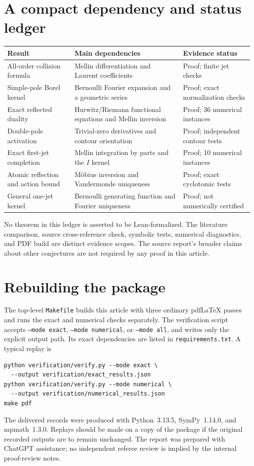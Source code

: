 \documentclass[11pt,a4paper]{article}
\numberwithin{equation}{section}
\theoremstyle{definition}\newtheorem{definition}[theorem]{Definition}
\theoremstyle{remark}\newtheorem{remark}[theorem]{Remark}
\begin{document}
\appendix
\section{A compact dependency and status ledger}
\label{app:ledger}

\begin{center}
\small
\begin{tabular}{@{}p{45mm}p{58mm}p{35mm}@{}}
\toprule
Result & Main dependencies & Evidence status\\
\midrule
All-order collision formula & Mellin differentiation and Laurent coefficients
 & Proof; finite jet checks\\[3pt]
Simple-pole Borel kernel & Bernoulli Fourier expansion and a geometric series
 & Proof; exact normalization checks\\[3pt]
Exact reflected duality & Hurwitz/Riemann functional equations and Mellin inversion
 & Proof; 36 numerical instances\\[3pt]
Double-pole activation & Trivial-zero derivatives and contour orientation
 & Proof; independent contour tests\\[3pt]
Exact first-jet completion & Mellin integration by parts and the $I$ kernel
 & Proof; 10 numerical instances\\[3pt]
Atomic reflection and action bound & M\"obius inversion and Vandermonde uniqueness
 & Proof; exact cyclotomic tests\\[3pt]
General one-jet kernel & Bernoulli generating function and Fourier uniqueness
 & Proof; not numerically certified\\
\bottomrule
\end{tabular}
\end{center}

No theorem in this ledger is asserted to be Lean-formalized. The
literature comparison, source cross-reference check, symbolic tests,
numerical diagnostics, and PDF build are distinct evidence scopes.
The source report's broader claims about other conjectures are not
required by any proof in this article.

\section{Rebuilding the package}
The top-level \texttt{Makefile} builds this article with three ordinary
pdfLaTeX passes and runs the exact and numerical checks separately.
The verification script accepts \texttt{--mode exact},
\texttt{--mode numerical}, or \texttt{--mode all}, and writes only the
explicit output path. Its exact dependencies are listed in
\texttt{requirements.txt}. A typical replay is
\begin{verbatim}
python verification/verify.py --mode exact \
  --output verification/exact_results.json
python verification/verify.py --mode numerical \
  --output verification/numerical_results.json
make pdf
\end{verbatim}
The delivered records were produced with Python~3.13.5, SymPy~1.14.0,
and mpmath~1.3.0. Replays should be made on a copy of the package if the
original recorded outputs are to remain unchanged. The report was
prepared with ChatGPT assistance; no independent referee review is
implied by the internal proof-review notes.
\end{document}
